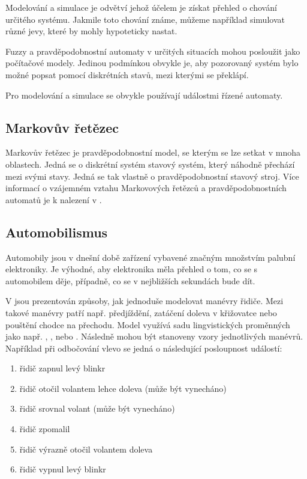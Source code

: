 Modelování a simulace je odvětví jehož účelem je získat přehled o chování určitého systému. Jakmile toto chování známe, můžeme například simulovat různé jevy, které by mohly hypoteticky nastat.

Fuzzy a pravděpodobnostní automaty v určitých situacích mohou posloužit jako počítačové modely. Jedinou podmínkou obvykle je, aby pozorovaný systém bylo možné popsat pomocí diskrétních stavů, mezi kterými se překlápí. 

Pro modelování a simulace se obvykle používají událostmi řízené automaty.

\subsection{Markovův řetězec}
Markovův řetězec je pravděpodobnostní model, se kterým se lze setkat v mnoha oblastech. Jedná se o diskrétní systém stavový systém, který náhodně přechází mezi svými stavy. Jedná se tak vlastně o pravděpodobnostní stavový stroj. Více informací o vzájemném vztahu Markovových řetězců a pravděpodobnostních automatů je k nalezení v \cite{DupDenEsp-LiProAuHidMarMod+, Hac+-ProAnaLarFinStaMac}.

\subsection{Automobilismus}
Automobily jsou v dnešní době zařízení vybavené značným množstvím palubní elektroniky. Je výhodné, aby elektronika měla přehled o tom, co se s automobilem děje, případně, co se v nejbližších sekundách bude dít.

V \cite{Hul+-ManRecUsProFinStaMacFuzLog, TriHei-ExpDesSeqFuzPer} jsou prezentován způsoby, jak jednoduše modelovat manévry řidiče. Mezi takové manévry patří např. předjíždění, zatáčení doleva v křižovatce nebo pouštění chodce na přechodu. Model využívá sadu lingvistických proměnných jako např. , ,  nebo . Následně mohou být stanoveny vzory jednotlivých manévrů. Například při odbočování vlevo se jedná o následující posloupnost událostí:
\begin{enumerate}
 \item řidič zapnul levý blinkr
 \item řidič otočil volantem lehce doleva (může být vynecháno)
 \item řidič srovnal volant (může být vynecháno)
 \item řidič zpomalil
 \item řidič výrazně otočil volantem doleva
 \item řidič vypnul levý blinkr
\end{enumerate}

